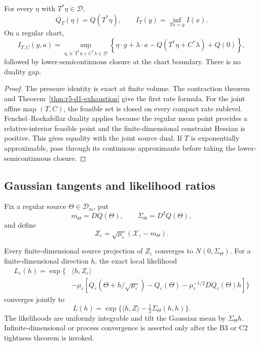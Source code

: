 \begin{theorem}
\label{thm:r5-d1-contraction}
For every \(\eta\) with \(T^*\eta\in\mathcal D\),
\[
 Q_T(\eta)=Q(T^*\eta),
 \qquad I_T(y)=\inf_{Tx=y}I(x).
\]
On a regular chart,
\[
 I_{T,C}(y,a)=
 \sup_{\eta,\lambda:\,T^*\eta+C^*\lambda\in\mathcal D}
 \left\{
  \eta\cdot y+\lambda\cdot a
  -Q(T^*\eta+C^*\lambda)+Q(0)
 \right\},
\]
followed by lower-semicontinuous closure at the chart boundary.  There is no
duality gap.
\end{theorem}

\begin{proof}
The pressure identity is exact at finite volume.  The contraction theorem and
Theorem~\ref{thm:r5-d1-exhaustion} give the first rate formula.  For the joint
affine map \((T,C)\), the feasible set is closed on every compact rate
sublevel.  Fenchel--Rockafellar duality applies because the regular mean point
provides a relative-interior feasible point and the finite-dimensional
constraint Hessian is positive.  This gives equality with the joint source
dual.  If \(T\) is exponentially approximable, pass through its continuous
approximants before taking the lower-semicontinuous closure.
\end{proof}

\subsection{Gaussian tangents and likelihood ratios}

Fix a regular source \(\Theta\in\mathcal D_m\), put
\[
 m_\Theta=DQ(\Theta),
 \qquad\Sigma_\Theta=D^2Q(\Theta),
\]
and define
\[
 Z_\varepsilon=\sqrt{\mu_\varepsilon}
 (\mathcal X_\varepsilon-m_\Theta).
\]

\begin{theorem}
\label{thm:r5-d1-likelihood}
Every finite-dimensional source projection of \(Z_\varepsilon\) converges to
\(N(0,\Sigma_\Theta)\).  For a finite-dimensional direction \(h\), the exact
local likelihood
\[
 \begin{aligned}
 L_\varepsilon(h)=\exp\{&
 \langle h,Z_\varepsilon\rangle\\
 &-\mu_\varepsilon[
 Q_\varepsilon(\Theta+h/\sqrt{\mu_\varepsilon})
 -Q_\varepsilon(\Theta)
 -\mu_\varepsilon^{-1/2}DQ_\varepsilon(\Theta)h]
 \}
 \end{aligned}
\]
converges jointly to
\[
 L(h)=\exp\{\langle h,Z\rangle
 -\tfrac12\Sigma_\Theta(h,h)\}.
\]
The likelihoods are uniformly integrable and tilt the Gaussian mean by
\(\Sigma_\Theta h\).  Infinite-dimensional or process convergence is asserted
only after the B3 or C2 tightness theorem is invoked.
\end{theorem}

